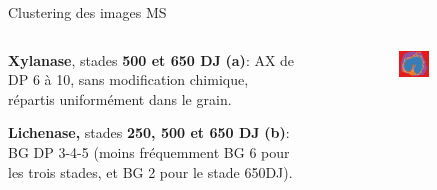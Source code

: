 \documentclass[10pt]{beamer}
\begin{document}
\begin{frame}{Clustering des images MS}
  \begin{columns}
    \begin{column}{.7\textwidth}
       \textbf{Xylanase}, stades\textbf{ 500 et 650 DJ} \textbf{(a)}: AX de DP 6 à 10, sans modification chimique, répartis uniformément dans le grain.

      \vspace{1.5cm}

      \textbf{Lichenase,} stades \textbf{250, 500 et 650 DJ} \textbf{(b)}: BG DP 3-4-5  (moins fréquemment BG 6 pour les trois stades, et BG 2 pour le stade 650DJ).
    \end{column}

    \begin{column}{.3\textwidth}
      \begin{figure}[ht] 
       \centering
        \begin{subfigure}[t]{0.99\textwidth}
          \centering
          \includegraphics[width=0.9\textwidth]{fig/clustering_500Xyl_s5.png}
          \caption{}
          \label{subfig:clustering500Xyl}
        \end{subfigure}
        \begin{subfigure}[t]{0.99\textwidth}
          \centering

\end{subfigure}
\end{figure}
\end{column}
\end{columns}
\end{frame}
\end{document}
